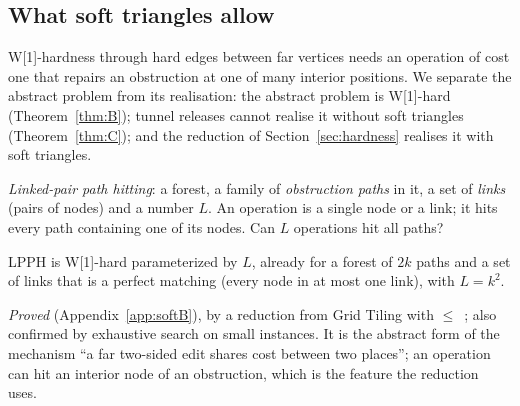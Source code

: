 \subsection{What soft triangles allow}\label{sec:softhard}
W[1]-hardness through hard edges between far vertices needs an operation of cost one that repairs an obstruction at one of many interior positions. We separate the abstract problem from its realisation: the abstract problem is W[1]-hard (Theorem~\ref{thm:B}); tunnel releases cannot realise it without soft triangles (Theorem~\ref{thm:C}); and the reduction of Section~\ref{sec:hardness} realises it with soft triangles.
\begin{definition}[LPPH]
\emph{Linked-pair path hitting}: a forest, a family of \emph{obstruction paths} in it, a set of \emph{links} (pairs of nodes) and a number $L$. An operation is a single node or a link; it hits every path containing one of its nodes. Can $L$ operations hit all paths?
\end{definition}
\begin{theorem}\label{thm:B}
LPPH is W[1]-hard parameterized by $L$, already for a forest of $2k$ paths and a set of links that is a perfect matching (every node in at most one link), with $L=k^2$.
\end{theorem}
\emph{Proved} (Appendix~\ref{app:softB}), by a reduction from Grid Tiling with $\le$~\cite{Cygan15}; also confirmed by exhaustive search on small instances. It is the abstract form of the mechanism ``a far two-sided edit shares cost between two places''; an operation can hit an interior node of an obstruction, which is the feature the reduction uses.


